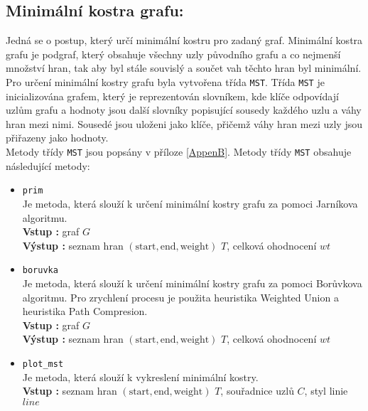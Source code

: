 \subsection{Minimální kostra grafu:}
Jedná se o postup, který určí minimální kostru pro zadaný graf. Minimální kostra grafu je podgraf, který obsahuje všechny uzly původního grafu a co nejmenší množství hran, tak aby byl stále souvislý a součet vah těchto hran byl minimální. Pro určení minimální kostry grafu byla vytvořena třída \texttt{MST}. Třída \texttt{MST} je inicializována grafem, který je reprezentován slovníkem, kde klíče odpovídají uzlům grafu a hodnoty jsou další slovníky popisující sousedy každého uzlu a váhy hran mezi nimi. Sousedé jsou uloženi jako klíče, přičemž váhy hran mezi uzly jsou přiřazeny jako hodnoty.\\
Metody třídy \texttt{MST} jsou popsány v příloze \ref{AppenB}. Metody třídy \texttt{MST} obsahuje následující metody:
\begin{itemize}
    \item \texttt{prim}\\
    Je metoda, která slouží k určení minimální kostry grafu za pomoci Jarníkova algoritmu.\\
    \textbf{Vstup : } graf $G$\\
    \textbf{Výstup : } seznam hran $(\text{start}, \text{end}, \text{weight})$ $T$, celková ohodnocení $wt$
    \item \texttt{boruvka}\\
    Je metoda, která slouží k určení minimální kostry grafu za pomoci Borůvkova algoritmu. Pro zrychlení procesu je použita heuristika Weighted Union a heuristika Path Compresion.\\
    \textbf{Vstup : } graf $G$\\
    \textbf{Výstup : } seznam hran $(\text{start}, \text{end}, \text{weight})$ $T$, celková ohodnocení $wt$
    \item \texttt{plot\_mst}\\
    Je metoda, která slouží k vykreslení minimální kostry.\\
    \textbf{Vstup : } seznam hran $(\text{start}, \text{end}, \text{weight})$ $T$, souřadnice uzlů $C$, styl linie $line$
\end{itemize}

